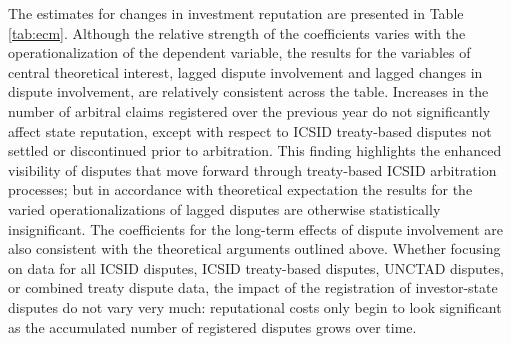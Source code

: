 \documentclass[12pt,onesided]{amsart}
\begin{document}
The estimates for changes in investment reputation are presented in Table \ref{tab:ecm}. Although the relative strength of the coefficients varies with the operationalization of the dependent variable, the results for the variables of central theoretical interest, lagged dispute involvement and lagged changes in dispute involvement, are relatively consistent across the table. Increases in the number of arbitral claims registered over the previous year do not significantly affect state reputation, except with respect to ICSID treaty-based disputes not settled or discontinued prior to arbitration. This finding highlights the enhanced visibility of disputes that move forward through treaty-based ICSID arbitration processes; but in accordance with theoretical expectation the results for the varied operationalizations of lagged disputes are otherwise statistically insignificant. The coefficients for the long-term effects of dispute involvement are also consistent with the theoretical arguments outlined above. Whether focusing on data for all ICSID disputes, ICSID treaty-based disputes, UNCTAD disputes, or combined treaty dispute data, the impact of the registration of investor-state disputes do not vary very much: reputational costs only begin to look significant as the accumulated number of registered disputes grows over time.

\end{document}
